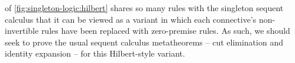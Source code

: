 











 of \cref{fig:singleton-logic:hilbert} shares so many rules with the singleton sequent calculus that it can be viewed as a variant in which each connective's non-invertible rules have been replaced with zero-premise rules.
As such, we should seek to prove the usual sequent calculus metatheorems -- cut elimination and identity expansion -- for this Hilbert-style variant.


